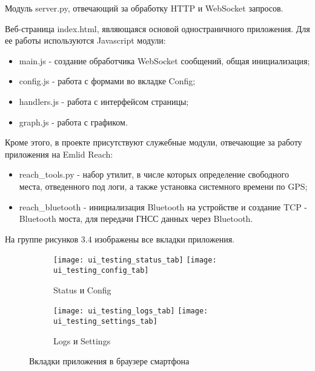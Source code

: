 Модуль server.py, отвечающий за обработку HTTP и WebSocket запросов.

Веб-страница index.html, являющаяся основой одностраничного приложения. Для ее работы используются Javascript модули:

\begin{itemize}
  \item main.js - создание обработчика WebSocket сообщений, общая инициализация;
  \item config.js - работа с формами во вкладке Config;
  \item handlers.js - работа с интерфейсом страницы;
  \item graph.js - работа с графиком.
\end{itemize}

Кроме этого, в проекте присутствуют служебные модули, отвечающие за работу приложения на Emlid Reach:

\begin{itemize}
  \item reach\_tools.py - набор утилит, в числе которых определение свободного места, отведенного под логи, а также установка системного времени по GPS;
  \item reach\_bluetooth - инициализация Bluetooth на устройстве и создание TCP - Bluetooth моста, для передачи ГНСС данных через Bluetooth.
\end{itemize}

На группе рисунков 3.4 изображены все вкладки приложения.

\begin{figure}
  \label{img:latex}
  \begin{subfigure}{\linewidth}
    \center
    \texttt{[image: ui\_testing\_status\_tab]}
    \texttt{[image: ui\_testing\_config\_tab]}
    \caption{Status и Config}
  \end{subfigure}\par\medskip
  \begin{subfigure}{\linewidth}
    \center
    \texttt{[image: ui\_testing\_logs\_tab]}
    \texttt{[image: ui\_testing\_settings\_tab]}
    \caption{Logs и Settings}
  \end{subfigure}\par\medskip
  \caption{Вкладки приложения в браузере смартфона}
\end{figure}